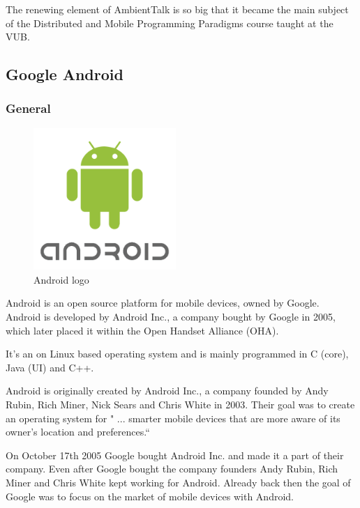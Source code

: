 \documentclass[a4paper,12pt]{report}
\begin{document}
The renewing element of AmbientTalk is so big that it became the main subject of the Distributed and Mobile Programming Paradigms course taught at the VUB.
\subsection{Google Android}



\subsubsection{General}
\begin{figure}
  \begin{center}
    \includegraphics[width=0.48\textwidth]{images/android.png}
  \end{center}
  \caption{Android logo}
\end{figure}
Android is an open source platform for mobile devices, owned by Google. Android is developed by Android Inc., a company bought by Google in 2005, which later placed it 
within the Open Handset Alliance (OHA). 

It's an on Linux based operating system and is mainly programmed in C (core), Java (UI) and C++.

Android is originally created by Android Inc., a company founded by Andy Rubin, Rich Miner, Nick Sears and Chris White in 2003. Their goal was to create an operating system
for " ... smarter mobile devices that are more aware of its owner's location and preferences.`` 

On October 17th 2005 Google bought Android Inc. and made it a part of their company. Even after Google bought the company founders Andy Rubin, Rich Miner and Chris White
kept working for Android. Already back then the goal of Google was to focus on the market of mobile devices with Android.
\end{document}
